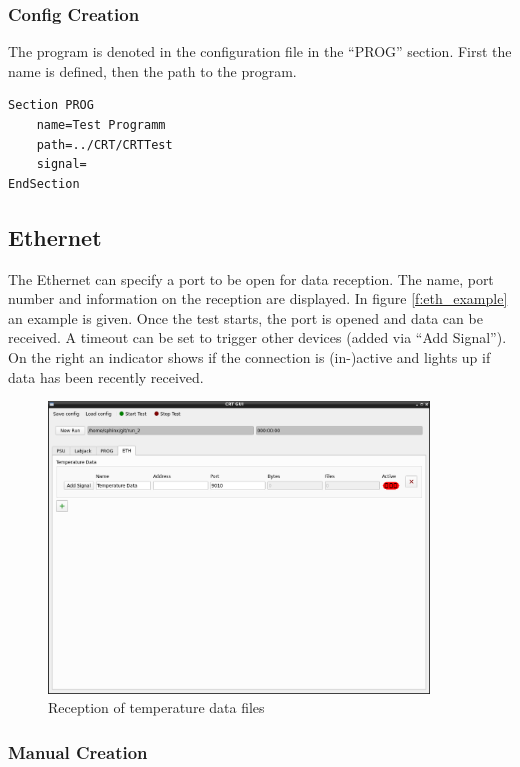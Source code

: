 \documentclass[10pt,a4paper]{article}
\begin{document}
		\subsubsection{Config Creation}
		The program is denoted in the configuration file in the \enquote{PROG} section. First the name is defined, then the path to the program.
	
\begin{lstlisting}[caption=PROG Config]
Section PROG
	name=Test Programm
	path=../CRT/CRTTest
	signal=
EndSection
\end{lstlisting}
	
	\newpage
	\subsection{Ethernet}
	The Ethernet can specify a port to be open for data reception. The name, port number and information on the reception are displayed. In figure \eqref{f:eth_example} an example is given. Once the test starts, the port is opened and data can be received. A timeout can be set to trigger other devices (added via \enquote{Add Signal}). On the right an indicator shows if the connection is (in-)active and lights up if data has been recently received. 
	
	\begin{figure}[H]
\centering
\includegraphics[width=0.9\textwidth]{./8_ETH_example.png}
\caption{Reception of temperature data files}
\label{f:eth_example}
	\end{figure}	 
	
	\subsubsection{Manual Creation}	
	\label{c:eth_manual_creation}
	
\end{document}
